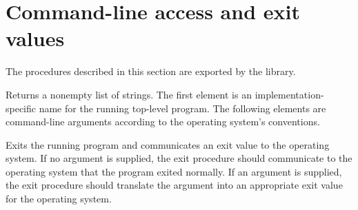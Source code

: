 \section{Command-line access and exit values}
\label{programlibsection}

The procedures described in this section are exported by the
 library.

\begin{entry}{%
}

Returns a nonempty list of strings.
The first element is an implementation-specific
name for the running top-level program.  The following elements are command-line
arguments according to the operating system's conventions.
\end{entry}

\begin{entry}{%
}

Exits the running program and communicates an exit value to the 
operating system.  If no argument is supplied, the {\cf exit}
procedure should communicate to the operating system that the program 
exited normally.  If an argument is supplied, the {\cf exit} procedure 
should translate the argument into an appropriate exit value for the 
operating system.
\end{entry}

